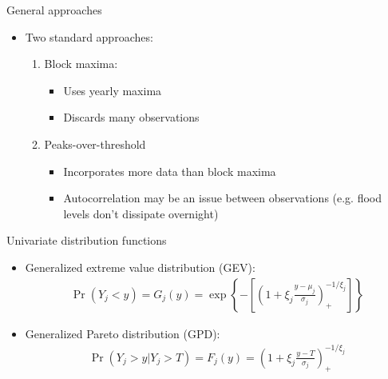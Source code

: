 \documentclass{beamer}
\begin{document}
\begin{frame}{General approaches}
  \begin{itemize}
    \item Two standard approaches:
    \begin{enumerate}[1.] \setlength{\itemsep}{0.5em}
      \item Block maxima:
      \begin{itemize}
        \item Uses yearly maxima
        \item Discards many observations
      \end{itemize}
      \item Peaks-over-threshold
      \begin{itemize}
        \item Incorporates more data than block maxima
        \item Autocorrelation may be an issue between observations (e.g. flood levels don't dissipate overnight)
      \end{itemize}
    \end{enumerate}
  \end{itemize}
\end{frame}

\begin{frame}{Univariate distribution functions}
  \begin{itemize}
    \item Generalized extreme value distribution (GEV):
    \begin{align*}
      \Pr(Y_j < y) = G_j(y) = \exp \left\{ -\left[ \left(1 + \xi_j \frac{y - \mu_j}{\sigma_j}\right)_+^{-1/\xi_j} \right] \right\}
    \end{align*}
    \item Generalized Pareto distribution (GPD):
    \begin{align*}
      \Pr(Y_j > y | Y_j > T) = F_j(y) = \left( 1 + \xi_j \frac{y - T}{\sigma_j} \right)_+^{-1/\xi_j}
    \end{align*}
  \end{itemize}
\end{frame}
\end{document}
